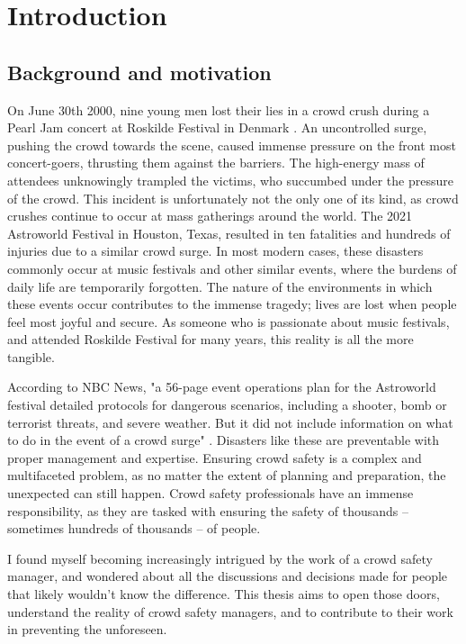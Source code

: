 \chapter{Introduction}

\section{Background and motivation}
\label{sec:background}
On June 30th 2000, nine young men lost their lies in a crowd crush during a Pearl Jam concert at Roskilde Festival in Denmark \cite{pearl_jam}. An uncontrolled surge, pushing the crowd towards the scene, caused immense pressure on the front most concert-goers, thrusting them against the barriers. The high-energy mass of attendees unknowingly trampled the victims, who succumbed under the pressure of the crowd. This incident is unfortunately not the only one of its kind, as crowd crushes continue to occur at mass gatherings around the world. The 2021 Astroworld Festival in Houston, Texas, resulted in ten fatalities and hundreds of injuries due to a similar crowd surge. In most modern cases, these disasters commonly occur at music festivals and other similar events, where the burdens of daily life are temporarily forgotten. The nature of the environments in which these events occur contributes to the immense tragedy; lives are lost when people feel most joyful and secure. As someone who is passionate about music festivals, and attended Roskilde Festival for many years, this reality is all the more tangible.

According to NBC News, "a 56-page event operations plan for the Astroworld festival detailed protocols for dangerous scenarios, including a shooter, bomb or terrorist threats, and severe weather. But it did not include information on what to do in the event of a crowd surge" \cite{astroworld}. Disasters like these are preventable with proper management and expertise. Ensuring crowd safety is a complex and multifaceted problem, as no matter the extent of planning and preparation, the unexpected can still happen. Crowd safety professionals have an immense responsibility, as they are tasked with ensuring the safety of thousands -- sometimes hundreds of thousands -- of people.

I found myself becoming increasingly intrigued by the work of a crowd safety manager, and wondered about all the discussions and decisions made for people that likely wouldn't know the difference. This thesis aims to open those doors, understand the reality of crowd safety managers, and to contribute to their work in preventing the unforeseen.


